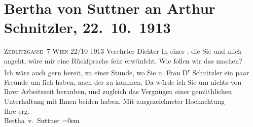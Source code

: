 

         
         \renewcommand{\erwaehntePersonen}{Personen: Olga Schnitzler, Bertha von Suttner}
         \renewcommand{\erwaehnteOrte}{Orte: Sternwartestraße, Wien, Zedlitzgasse}
         \renewcommand{\erwaehnteWerke}{}
               \section[Bertha von Suttner an Arthur Schnitzler, 22. 10. 1913]{ Bertha von Suttner an Arthur Schnitzler, 22. 10. 1913}\nopagebreak{}\rehead{ }\begin{ledgroupsized}[t]{13cm}\normalsize\beginnumbering{} \toendnotes[C]{\smallbreak\pagebreak[2]} 
\toendnotes[C]{\smallbreak}\pstart
           \noindent{}\centering{}{\pb}\textsc{Zedlitzgasse 7 Wien}\pend
           \pstart
           \raggedleft{}22/10 1913\pend
           \pstart{}Verehrter Dichter\pend\pstart
           In einer \label{K_L02153-1v}\label{K_L02153-1h}, die Sie und mich angeht, wäre mir eine Rückſprache ſehr erwünſcht.\pend
           \pstart
           Wie ſollen wir das machen? Ich wäre auch gern bereit, zu einer Stunde, wo Sie u. Frau
                  D\textsuperscript{r}{ }Schnitzler ein paar Freunde um ſich haben, nach
               der \label{K_L02153-2v}\label{K_L02153-2h} zu kommen. Da {\pb}würde ich Sie um
               nichts von Ihrer Arbeitszeit berauben, und zugleich das Vergnügen einer gemüthlichen
               Unterhaltung mit Ihnen beiden  haben.\pend
           \pstart
           Mit ausgezeichneter Hochachtung{\\[\baselineskip]}Ihre erg.{\\[\baselineskip]}\spacefill\mbox{Bertha v. Suttner}\pend
           \leftskip=0em{}
         
         \endnumbering{}\end{ledgroupsized}  \newcommand{\dateiname}{L02153}\newcommand{\titel}{Bertha von Suttner an Arthur Schnitzler, 22. 10. 1913}\newcommand{\editorInnen}{Martin Anton Müller und Gerd-Hermann Susen}
      